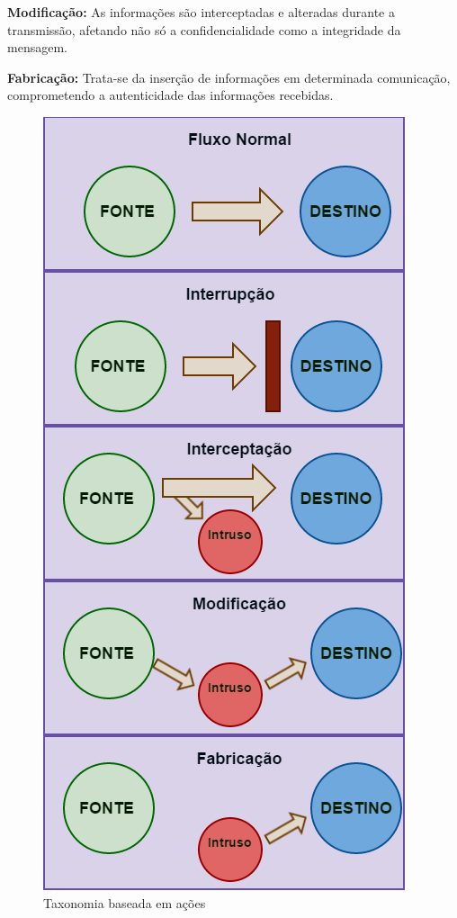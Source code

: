 \documentclass[
	12pt,				%
	openright,			%
	oneside,
	a4paper,			%
	english,			%
	french,				%
	spanish,			%
	brazil				%
	]{abntex2}
\begin{document}
\textbf{Modificação:} As informações são interceptadas e alteradas 
durante a transmissão, afetando não só a confidencialidade como a integridade da mensagem.

\textbf{Fabricação:} Trata-se da inserção de informações em determinada comunicação, comprometendo a autenticidade das informações recebidas.

\begin{figure}[!htb]
     \centering
     \includegraphics[scale=0.8]{Imagens/Classificacoes.png}
     \caption{Taxonomia baseada em ações}
\end{figure}
\end{document}
